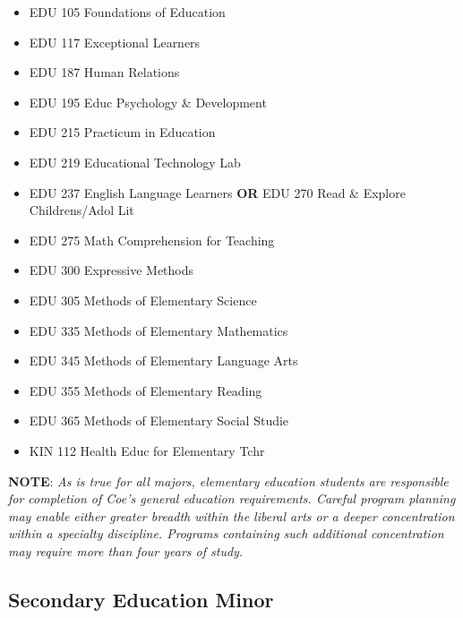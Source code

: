 \documentclass[
  letterpaper,
]{scrbook}
\providecommand{\tightlist}{%
  \setlength{\itemsep}{0pt}\setlength{\parskip}{0pt}}
\begin{document}
\begin{enumerate}
  \begin{itemize}
  \tightlist
  \item
    EDU 105 Foundations of Education
  \item
    EDU 117 Exceptional Learners
  \item
    EDU 187 Human Relations
  \item
    EDU 195 Educ Psychology \& Development
  \item
    EDU 215 Practicum in Education
  \item
    EDU 219 Educational Technology Lab
  \item
    EDU 237 English Language Learners \textbf{OR} EDU 270 Read \&
    Explore Childrens/Adol Lit
  \item
    EDU 275 Math Comprehension for Teaching
  \item
    EDU 300 Expressive Methods
  \item
    EDU 305 Methods of Elementary Science
  \item
    EDU 335 Methods of Elementary Mathematics
  \item
    EDU 345 Methods of Elementary Language Arts
  \item
    EDU 355 Methods of Elementary Reading
  \item
    EDU 365 Methods of Elementary Social Studie
  \item
    KIN 112 Health Educ for Elementary Tchr
  \end{itemize}
\end{enumerate}

\textbf{NOTE}: \emph{As is true for all majors, elementary education
students are responsible for completion of Coe's general education
requirements. Careful program planning may enable either greater breadth
within the liberal arts or a deeper concentration within a specialty
discipline. Programs containing such additional concentration may
require more than four years of study.}

\subsection{Secondary Education Minor}\label{secondary-education-minor}
\end{document}
